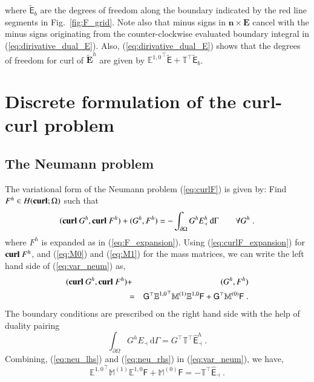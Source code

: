 \documentclass[graybox]{svmult}
\begin{document}
where $\widetilde{\mathsf{E}}_b$ are the degrees of freedom along the boundary indicated by the red line segments in Fig.~\ref{fig:F_grid}. Note also that minus signs in $
\bm{n}\times \bm{E}$ cancel with the minus signs originating from the counter-clockwise evaluated boundary integral in (\ref{eq:dirivative_dual_E}).
Also, (\ref{eq:dirivative_dual_E}) shows that the degrees of freedom for curl of $\widetilde{\bm{E}}^h$ are given by ${\mathbb{E}^{1,0}}^{\top} \widetilde{\mathsf{E}} + \mathbb{T}^{\top} \widetilde{\mathsf{E}}_b$.

\section{Discrete formulation of the curl-curl problem}\label{sec:Discrete_formulations_curl_curl}
\subsection{The Neumann problem}
The variational form of the Neumann problem (\ref{eq:curlF}) is given by: Find $F^h \in H(\mbox{\bf{curl}};\Omega)$ such that
\begin{equation} \label{eq:var_neum}
(\mbox{\bf{curl}}\ G^h, \mbox{\bf{curl}}\ F^h) + (G^h, F^h) = - \int _{\partial \Omega} G^h E_{\dashv}^h \ \mathrm{d}\Gamma\quad \quad \forall G^h \;.
\end{equation}
where $F^h$ is expanded as in (\ref{eq:F_expansion}).
Using (\ref{eq:curlF_expansion}) for $\mbox{\bf{curl}}\ F^h$, and (\ref{eq:M0}) and (\ref{eq:M1}) for the mass matrices, we can write the left hand side  of (\ref{eq:var_neum}) as,
\begin{eqnarray}
(\mbox{\bf{curl}}\ G^h, \mbox{\bf{curl}}\ F^h) & + & (G^h, F^h) \nonumber \\
 &=& \mathsf{G}^{\top}
{\mathbb{E}^{1,0}}^{\top}
\mathbb{M}^{(1)} \mathbb{E}^{1,0} \mathsf{F} + \mathsf{G}^{\top} \mathbb{M}^{(0)} \mathsf{F} \;. \label{eq:neu_lhs}
\end{eqnarray}
The boundary conditions are prescribed on the right hand side with the help of duality pairing
\begin{equation} \label{eq:neu_rhs}
\int _{\partial \Omega} G^h E_{\dashv}\ \mathrm{d} \Gamma = G^{\top} \mathbb{T}^{\top} \hat{\mathsf{E}}_{\dashv}^h \;.
\end{equation}
Combining, (\ref{eq:neu_lhs}) and (\ref{eq:neu_rhs}) in (\ref{eq:var_neum}), we have,
\begin{equation}
{\mathbb{E}^{1,0}}^{\top} \mathbb{M}^{(1)} \mathbb{E}^{1,0} \mathsf{F} + \mathbb{M}^{(0)} \mathsf{F} = -\mathbb{T}^{\top} \hat{\mathsf{E}}_{\dashv} \;.
\label{eq:discrete_crulF}
\end{equation}
\end{document}
